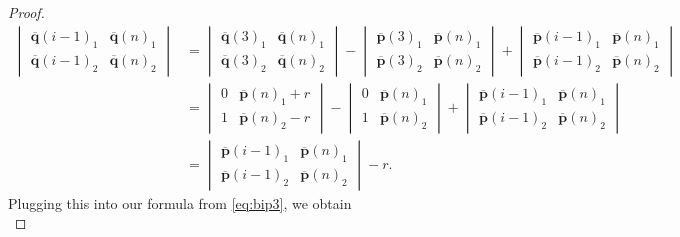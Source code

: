 \documentclass[11pt]{amsart}
\theoremstyle{definition}
\theoremstyle{remark}
\begin{document}
\begin{proof}
\begin{equation}
    \begin{split}
        \begin{vmatrix}
            \overline{\mathbf{q}}(i-1)_1 & \overline{\mathbf{q}}(n)_1 \\ \overline{\mathbf{q}}(i-1)_2 & \overline{\mathbf{q}}(n)_2
        \end{vmatrix} &= \begin{vmatrix} \overline{\mathbf{q}}(3)_1 & \overline{\mathbf{q}}(n)_1 \\ \overline{\mathbf{q}}(3)_2 & \overline{\mathbf{q}}(n)_2 \end{vmatrix} - \begin{vmatrix} \overline{\mathbf{p}}(3)_1 & \overline{\mathbf{p}}(n)_1 \\ \overline{\mathbf{p}}(3)_2 & \overline{\mathbf{p}}(n)_2 \end{vmatrix} + \begin{vmatrix} \overline{\mathbf{p}}(i-1)_1 & \overline{\mathbf{p}}(n)_1 \\ \overline{\mathbf{p}}(i-1)_2 & \overline{\mathbf{p}}(n)_2 \end{vmatrix} \\
        &= \begin{vmatrix} 0 & \overline{\mathbf{p}}(n)_1 + r \\ 1 & \overline{\mathbf{p}}(n)_2 - r \end{vmatrix} - \begin{vmatrix} 0 & \overline{\mathbf{p}}(n)_1 \\ 1 & \overline{\mathbf{p}}(n)_2 \end{vmatrix} + \begin{vmatrix} \overline{\mathbf{p}}(i-1)_1 & \overline{\mathbf{p}}(n)_1 \\ \overline{\mathbf{p}}(i-1)_2 & \overline{\mathbf{p}}(n)_2 \end{vmatrix} \\
        &= \begin{vmatrix}
            \overline{\mathbf{p}}(i-1)_1 & \overline{\mathbf{p}}(n)_1 \\ \overline{\mathbf{p}}(i-1)_2 & \overline{\mathbf{p}}(n)_2
        \end{vmatrix} - r.
    \end{split} 
    \end{equation}
    Plugging this into our formula from \cref{eq:bip3}, we obtain
    \begin{equation}\label{eq:bip5}

\end{equation}
\end{proof}
\end{document}
